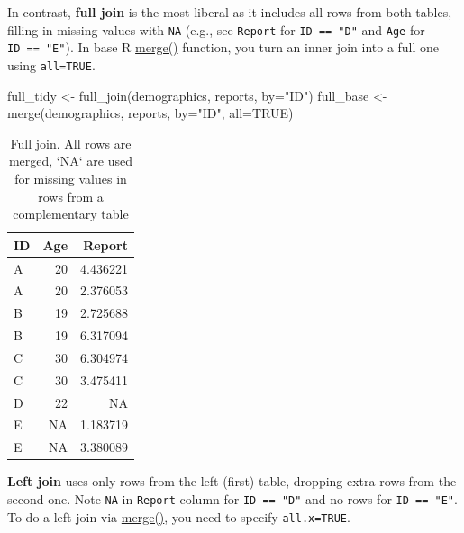 \documentclass[
]{book}
\newenvironment{Shaded}{\begin{snugshade}}{\end{snugshade}}
\newcommand{\AttributeTok}[1]{\textcolor[rgb]{0.77,0.63,0.00}{#1}}
\newcommand{\ConstantTok}[1]{\textcolor[rgb]{0.00,0.00,0.00}{#1}}
\newcommand{\FunctionTok}[1]{\textcolor[rgb]{0.00,0.00,0.00}{#1}}
\newcommand{\NormalTok}[1]{#1}
\newcommand{\OtherTok}[1]{\textcolor[rgb]{0.56,0.35,0.01}{#1}}
\newcommand{\StringTok}[1]{\textcolor[rgb]{0.31,0.60,0.02}{#1}}
\begin{document}
In contrast, \textbf{full join} is the most liberal as it includes all rows from both tables, filling in missing values with \texttt{NA} (e.g., see \texttt{Report} for \texttt{ID\ ==\ "D"} and \texttt{Age} for \texttt{ID\ ==\ "E"}). In base R \href{https://stat.ethz.ch/R-manual/R-devel/library/base/html/merge.html}{merge()} function, you turn an inner join into a full one using \texttt{all=TRUE}.

\begin{Shaded}
\begin{Highlighting}[]
\NormalTok{full\_tidy }\OtherTok{\textless{}{-}} \FunctionTok{full\_join}\NormalTok{(demographics, reports, }\AttributeTok{by=}\StringTok{"ID"}\NormalTok{) }
\NormalTok{full\_base }\OtherTok{\textless{}{-}} \FunctionTok{merge}\NormalTok{(demographics, reports, }\AttributeTok{by=}\StringTok{"ID"}\NormalTok{, }\AttributeTok{all=}\ConstantTok{TRUE}\NormalTok{)}
\end{Highlighting}
\end{Shaded}

\begin{table}

\caption{\label{tab:unnamed-chunk-184}Full join. All rows are merged, `NA` are used for missing values in rows from a complementary table}
\centering
\begin{tabular}[t]{l|r|r}
\hline
ID & Age & Report\\
\hline
A & 20 & 4.436221\\
\hline
A & 20 & 2.376053\\
\hline
B & 19 & 2.725688\\
\hline
B & 19 & 6.317094\\
\hline
C & 30 & 6.304974\\
\hline
C & 30 & 3.475411\\
\hline
D & 22 & NA\\
\hline
E & NA & 1.183719\\
\hline
E & NA & 3.380089\\
\hline
\end{tabular}
\end{table}

\textbf{Left join} uses only rows from the left (first) table, dropping extra rows from the second one. Note \texttt{NA} in \texttt{Report} column for \texttt{ID\ ==\ "D"} and no rows for \texttt{ID\ ==\ "E"}. To do a left join via \href{https://stat.ethz.ch/R-manual/R-devel/library/base/html/merge.html}{merge()}, you need to specify \texttt{all.x=TRUE}.
\end{document}
